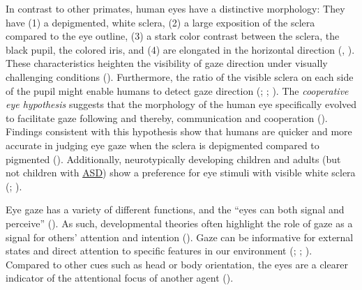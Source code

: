 \documentclass[
]{scrbook}
\begin{document}
In contrast to other primates, human eyes have a distinctive morphology: They have (1) a depigmented, white sclera, (2) a large exposition of the sclera compared to the eye outline, (3) a stark color contrast between the sclera, the black pupil, the colored iris, and (4) are elongated in the horizontal direction (, ). These characteristics heighten the visibility of gaze direction under visually challenging conditions (). Furthermore, the ratio of the visible sclera on each side of the pupil might enable humans to detect gaze direction (; ; ). The \emph{cooperative eye hypothesis} suggests that the morphology of the human eye specifically evolved to facilitate gaze following and thereby, communication and cooperation (). Findings consistent with this hypothesis show that humans are quicker and more accurate in judging eye gaze when the sclera is depigmented compared to pigmented (). Additionally, neurotypically developing children and adults (but not children with \hyperref[acronyms_ASD]{ASD}) show a preference for eye stimuli with visible white sclera (; ).

Eye gaze has a variety of different functions, and the ``eyes can both signal and perceive'' (). As such, developmental theories often highlight the role of gaze as a signal for others' attention and intention (). Gaze can be informative for external states and direct attention to specific features in our environment (; ; ). Compared to other cues such as head or body orientation, the eyes are a clearer indicator of the attentional focus of another agent ().
\end{document}

